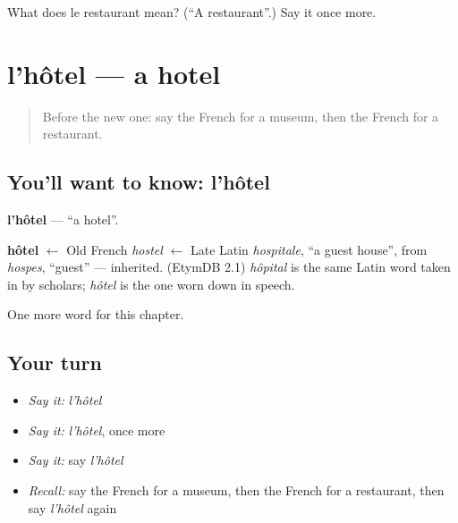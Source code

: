 \begin{tcolorbox}[breakable,colback=teal!4,colframe=teal!35!black,title={Before you move on}]
What does le restaurant mean? (\textquotedblleft{}A restaurant\textquotedblright{}.) Say it once more.
\end{tcolorbox}
\section[l'hôtel]{l'hôtel — a hotel}

\label{lesson:FR-C101-hotel}



\begin{quote}
Before the new one: say the French for a museum, then the French for a restaurant.
\end{quote}

\subsection*{You'll want to know: l'hôtel}
\textbf{l'hôtel} — \textquotedblleft{}a hotel\textquotedblright{}.

\begin{cousinweb}
\textbf{hôtel} $\leftarrow$ Old French \emph{hostel} $\leftarrow$ Late Latin \emph{hospitale}, \textquotedblleft{}a guest house\textquotedblright{}, from \emph{hospes}, \textquotedblleft{}guest\textquotedblright{} — inherited. (EtymDB 2.1) \emph{hôpital} is the same Latin word taken in by scholars; \emph{hôtel} is the one worn down in speech.
\end{cousinweb}

\begin{grammarlens}[title={What you've built}]
One more word for this chapter.
\end{grammarlens}

\subsection*{Your turn}
\begin{itemize}
\raggedright
  \item \emph{Say it:} \emph{l'hôtel}
  \item \emph{Say it:} \emph{l'hôtel}, once more
  \item \emph{Say it:} say \emph{l'hôtel}
  \item \emph{Recall:} say the French for a museum, then the French for a restaurant, then say \emph{l'hôtel} again
\end{itemize}

